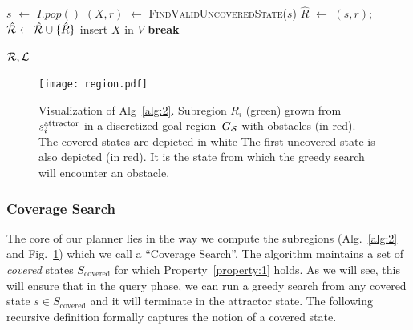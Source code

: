 \documentclass[a4paper]{report}
\begin{document}
\begin{algorithm}[t]
\begin{algorithmic}[1]
\vspace{2mm}        
        
         \label{alg:1:iv_loop}
            \State $s$ $\leftarrow$ $I.pop()$
            
\State $(X, r)$ $\leftarrow$ \textsc{FindValidUncoveredState}($s$)
                \State $\hat{R}$ $\leftarrow$ $(s,r)$;
        \hspace{2mm}
        $\hat{\mathcal{R}} \leftarrow \hat{\mathcal{R}} \cup \{ \hat{R} \}$   \label{alg:1:iv_region}
                    \label{alg:1:x_states}
                    \State insert $X$ in $V$
                    \State \textbf{break} \label{alg:1:break}
                \EndIf
            \EndIf
        \EndWhile
    \EndWhile

  \vspace{2mm}

  \State \Return $\mathcal{R}, \mathcal{L}$
\EndProcedure
\end{algorithmic}
\end{algorithm}

\begin{figure}[tb]
  \centering
    \texttt{[image: region.pdf]}
  \caption{
  Visualization of Alg~\ref{alg:2}. Subregion $R_i$ (green) grown from $s^{\text{attractor}}_i$ in a discretized goal region~$G_\mathcal{S}$ with obstacles (in red). The covered states are depicted in white
  The first uncovered state is also depicted (in red). It is the state from which the greedy search will encounter an obstacle.
}
    \label{fig:alg2}
\end{figure}

\subsubsection{Coverage Search}
The core of our planner lies in the way we compute the subregions (Alg.~\ref{alg:2} and Fig.~\ref{fig:alg2}) which we call a ``Coverage Search''. The algorithm maintains a set of \emph{covered} states $S_{\text{covered}}$ for which Property~\ref{property:1} holds.
As we will see, this will ensure that in the query phase, we can run a greedy search from any covered state $s \in S_{\text{covered}}$ and it will terminate in the attractor state. 
%
The following recursive definition formally captures the notion of a covered state.
\end{document}
